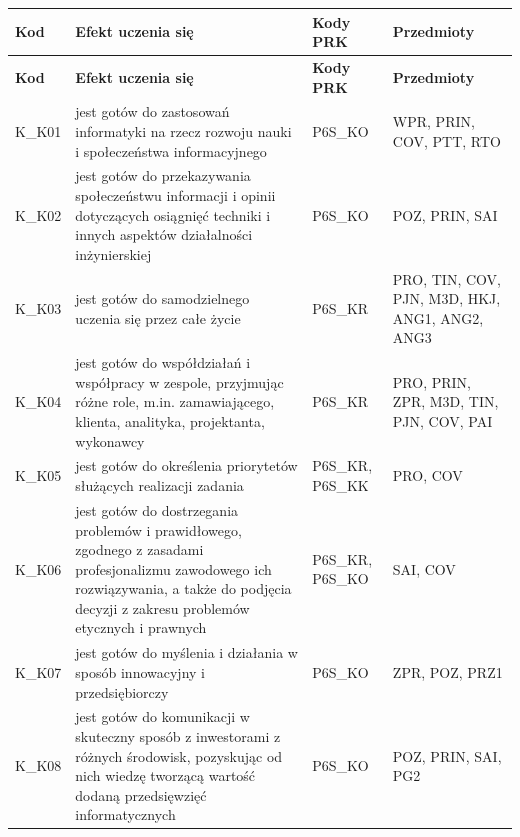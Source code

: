 \documentclass[12pt,a4paper]{article}
\newcommand{\thdrule}{\noalign{\global\setlength{\extrarowheight}{0pt}}}
\newcommand{\thdend}{\noalign{\global\setlength{\extrarowheight}{4pt}}}
\begin{document}
{\scriptsize
\begin{longtable}{m{1cm}m{8.8cm}m{2.1cm}m{2.5cm}}
\thdrule\toprule
\rowcolor{pjatkRed} {\color{white}\footnotesize\textbf{\vphantom{Ag}Kod}} & {\color{white}\footnotesize\textbf{\vphantom{Ag}Efekt uczenia się}} & {\color{white}\footnotesize\textbf{\vphantom{Ag}Kody PRK}} & {\color{white}\footnotesize\textbf{\vphantom{Ag}Przedmioty}} \\
\midrule\thdend
\endfirsthead
\thdrule\toprule
\rowcolor{pjatkRed} {\color{white}\footnotesize\textbf{\vphantom{Ag}Kod}} & {\color{white}\footnotesize\textbf{\vphantom{Ag}Efekt uczenia się}} & {\color{white}\footnotesize\textbf{\vphantom{Ag}Kody PRK}} & {\color{white}\footnotesize\textbf{\vphantom{Ag}Przedmioty}} \\
\midrule\thdend
\endhead
\rowcolor{tableRowLight} K\_K01 & jest gotów do zastosowań informatyki na rzecz rozwoju nauki i społeczeństwa informacyjnego & {\scriptsize P6S\_KO} & {\scriptsize WPR, PRIN, COV, PTT, RTO} \\
\rowcolor{tableRowAlt} K\_K02 & jest gotów do przekazywania społeczeństwu informacji i opinii dotyczących osiągnięć techniki i innych aspektów działalności inżynierskiej & {\scriptsize P6S\_KO} & {\scriptsize POZ, PRIN, SAI} \\
\rowcolor{tableRowLight} K\_K03 & jest gotów do samodzielnego uczenia się przez całe życie & {\scriptsize P6S\_KR} & {\scriptsize PRO, TIN, COV, PJN, M3D, HKJ, ANG1, ANG2, ANG3} \\
\rowcolor{tableRowAlt} K\_K04 & jest gotów do współdziałań i współpracy w zespole, przyjmując różne role, m.in. zamawiającego, klienta, analityka, projektanta, wykonawcy & {\scriptsize P6S\_KR} & {\scriptsize PRO, PRIN, ZPR, M3D, TIN, PJN, COV, PAI} \\
\rowcolor{tableRowLight} K\_K05 & jest gotów do określenia priorytetów służących realizacji zadania & {\scriptsize P6S\_KR, P6S\_KK} & {\scriptsize PRO, COV} \\
\rowcolor{tableRowAlt} K\_K06 & jest gotów do dostrzegania problemów i prawidłowego, zgodnego z zasadami profesjonalizmu zawodowego ich rozwiązywania, a także do podjęcia decyzji z zakresu problemów etycznych i prawnych & {\scriptsize P6S\_KR, P6S\_KO} & {\scriptsize SAI, COV} \\
\rowcolor{tableRowLight} K\_K07 & jest gotów do myślenia i działania w sposób innowacyjny i przedsiębiorczy & {\scriptsize P6S\_KO} & {\scriptsize ZPR, POZ, PRZ1} \\
\rowcolor{tableRowAlt} K\_K08 & jest gotów do komunikacji w skuteczny sposób z inwestorami z różnych środowisk, pozyskując od nich wiedzę tworzącą wartość dodaną przedsięwzięć informatycznych & {\scriptsize P6S\_KO} & {\scriptsize POZ, PRIN, SAI, PG2} \\
\bottomrule
\end{longtable}}
\end{document}
